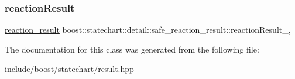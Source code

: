\subsubsection{\texorpdfstring{reaction\+Result\+\_\+}{reactionResult\_}}
{\footnotesize\ttfamily \mbox{\hyperlink{namespaceboost_1_1statechart_1_1detail_ab091bbb4c29327fb46ee479ea1b7255b}{reaction\+\_\+result}} boost\+::statechart\+::detail\+::safe\+\_\+reaction\+\_\+result\+::reaction\+Result\+\_\+\hspace{0.3cm}{\ttfamily [mutable]}, {\ttfamily [private]}}



The documentation for this class was generated from the following file\+:\begin{DoxyCompactItemize}
\item 
include/boost/statechart/\mbox{\hyperlink{result_8hpp}{result.\+hpp}}\end{DoxyCompactItemize}
